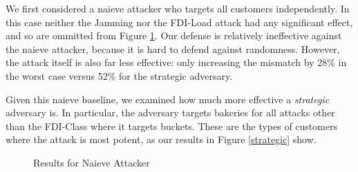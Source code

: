 We first considered a naieve attacker who targets all customers independently.  In this case neither the Jamming nor the FDI-Load attack had any significant effect, and so are ommitted from Figure \ref{naieve}.  Our defense is relatively ineffective against the naieve attacker, because it is hard to defend against randomness.  However, the attack itself is also far less effective: only increasing the mismatch by 28\% in the worst case versus 52\% for the strategic adversary.

Given this naieve baseline, we examined how much more effective a \emph{strategic} adversary is.  In particular, the adversary targets bakeries for all attacks other than the FDI-Class where it targets buckets.  These are the types of customers where the attack is most potent, as our results in Figure \ref{strategic} show.

\begin{figure}[htp]
    \centering
    \quad
    \caption{Results for Naieve Attacker}
    \label{naieve}  
\end{figure}

